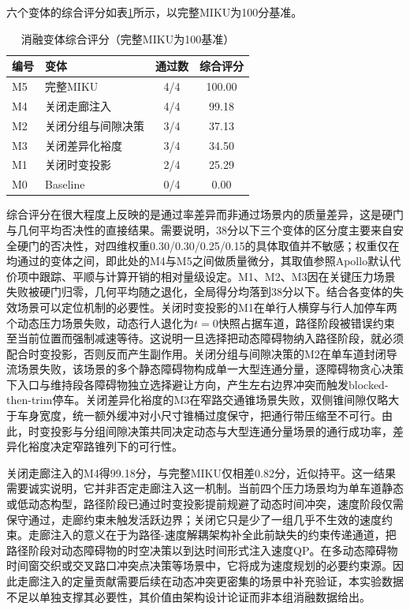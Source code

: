 \documentclass[a4paper,11pt]{ctexart}
\theoremstyle{definition}
\begin{document}
六个变体的综合评分如表\ref{tab:exp_ablation_score}所示，以完整MIKU为100分基准。

\begin{table}[htbp]
\centering
\caption{消融变体综合评分（完整MIKU为100基准）}
\label{tab:exp_ablation_score}
\small
\begin{tabular}{llcc}
\toprule
\textbf{编号} & \textbf{变体} & \textbf{通过数} & \textbf{综合评分} \\
\midrule
M5 & 完整MIKU             & 4/4 & 100.00 \\
M4 & 关闭走廊注入         & 4/4 & 99.18 \\
M2 & 关闭分组与间隙决策   & 3/4 & 37.13 \\
M3 & 关闭差异化裕度       & 3/4 & 34.50 \\
M1 & 关闭时变投影         & 2/4 & 25.29 \\
M0 & Baseline             & 0/4 & 0.00 \\
\bottomrule
\end{tabular}
\end{table}

综合评分在很大程度上反映的是通过率差异而非通过场景内的质量差异，这是硬门与几何平均否决性的直接结果。需要说明，38分以下三个变体的区分度主要来自安全硬门的否决性，对四维权重0.30/0.30/0.25/0.15的具体取值并不敏感；权重仅在均通过的变体之间，即此处的M4与M5之间做质量微分，其取值参照Apollo默认代价项中跟踪、平顺与计算开销的相对量级设定。M1、M2、M3因在关键压力场景失败被硬门归零，几何平均随之退化，全局得分均落到38分以下。结合各变体的失效场景可以定位机制的必要性。关闭时变投影的M1在单行人横穿与行人加停车两个动态压力场景失败，动态行人退化为$t=0$快照占据车道，路径阶段被错误约束至当前位置而强制减速等待。这说明一旦选择把动态障碍物纳入路径阶段，就必须配合时变投影，否则反而产生副作用。关闭分组与间隙决策的M2在单车道封闭导流场景失败，该场景的多个静态障碍物构成单一大型连通分量，逐障碍物贪心决策下入口与维持段各障碍物独立选择避让方向，产生左右边界冲突而触发blocked-then-trim停车。关闭差异化裕度的M3在窄路交通锥场景失败，双侧锥间隙仅略大于车身宽度，统一额外缓冲对小尺寸锥桶过度保守，把通行带压缩至不可行。由此，时变投影与分组间隙决策共同决定动态与大型连通分量场景的通行成功率，差异化裕度决定窄路锥列下的可行性。

关闭走廊注入的M4得99.18分，与完整MIKU仅相差0.82分，近似持平。这一结果需要诚实说明，它并非否定走廊注入这一机制。当前四个压力场景均为单车道静态或低动态构型，路径阶段已通过时变投影提前规避了动态时间冲突，速度阶段仅需保守通过，走廊约束未触发活跃边界；关闭它只是少了一组几乎不生效的速度约束。走廊注入的意义在于为路径-速度解耦架构补全此前缺失的约束传递通道，把路径阶段对动态障碍物的时空决策以到达时间形式注入速度QP。在多动态障碍物时间窗交织或交叉路口冲突点决策等场景中，它将成为速度规划的必要约束源。因此走廊注入的定量贡献需要后续在动态冲突更密集的场景中补充验证，本实验数据不足以单独支撑其必要性，其价值由架构设计论证而非本组消融数据给出。
\end{document}
